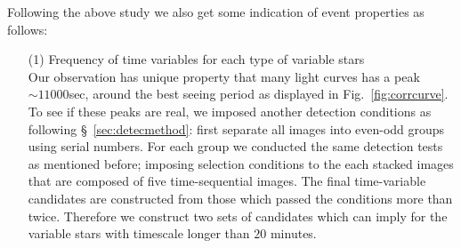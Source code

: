 \documentclass[iop, apj]{emulateapj}
\newcommand{\?}{\stackrel{?}{=}}
\begin{document}
Following the above study we also get some indication of event properties as follows: 
	\begin{itemize}
	\item[(1)]{ Frequency of time variables for each type of variable stars}\\
\label{sec:sampling}
Our observation has unique property that many light curves has a peak $\sim11000$sec, around the best seeing period as displayed in Fig.~\ref{fig:corrcurve}. To see if these peaks are real, we imposed another detection conditions as following \S~\ref{sec:detecmethod}: 
first separate all images into even-odd groups using serial numbers. For each group we conducted the same detection tests as mentioned before; imposing selection conditions to the each stacked images that are composed of five time-sequential images. 
The final time-variable candidates are constructed from those which passed the conditions more than twice. 
Therefore we construct two sets of candidates which can imply for the variable stars with timescale longer than $20$ minutes. 



\end{itemize}
\end{document}
